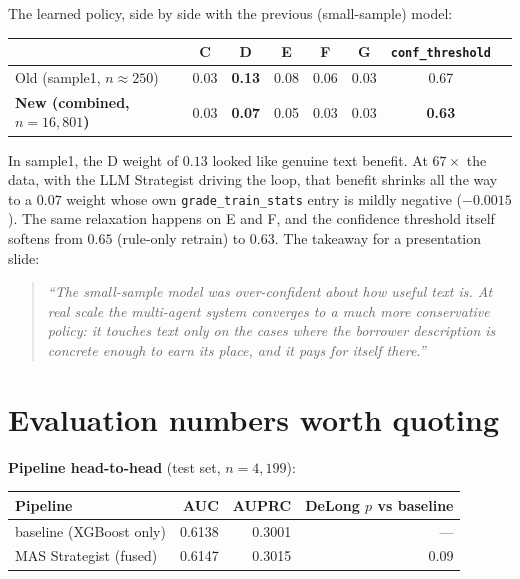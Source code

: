 \documentclass[11pt,letterpaper]{article}
\begin{document}
The learned policy, side by side with the previous (small-sample) model:

\begin{center}\small
\begin{tabular}{@{}lccccccc@{}}
\toprule
& \textbf{C} & \textbf{D} & \textbf{E} & \textbf{F} & \textbf{G} & \texttt{conf\_threshold} \\
\midrule
Old (sample1, $n \approx 250$)            & 0.03 & \textbf{0.13} & 0.08 & 0.06 & 0.03 & 0.67 \\
\textbf{New (combined, $n = 16{,}801$)}   & 0.03 & \textbf{0.07} & 0.05 & 0.03 & 0.03 & \textbf{0.63} \\
\bottomrule
\end{tabular}
\end{center}

In sample1, the D weight of $0.13$ looked like genuine text benefit. At
$67\times$ the data, with the LLM Strategist driving the loop, that
benefit shrinks all the way to a $0.07$ weight whose own
\texttt{grade\_train\_stats} entry is mildly negative ($-0.0015$). The same
relaxation happens on E and F, and the confidence threshold itself softens
from $0.65$ (rule-only retrain) to $0.63$. The takeaway for a presentation
slide:

\begin{quote}\small\itshape
``The small-sample model was over-confident about how useful text is. At
real scale the multi-agent system converges to a much more conservative
policy: it touches text only on the cases where the borrower description
is concrete enough to earn its place, and it pays for itself there.''
\end{quote}

\section{Evaluation numbers worth quoting}

\textbf{Pipeline head-to-head} (test set, $n = 4{,}199$):

\begin{center}\small
\begin{tabular}{@{}lrrr@{}}
\toprule
\textbf{Pipeline} & \textbf{AUC} & \textbf{AUPRC} & \textbf{DeLong $p$ vs baseline} \\
\midrule
baseline (XGBoost only)     & 0.6138 & 0.3001 & --- \\
MAS Strategist (fused)      & 0.6147 & 0.3015 & 0.09 \\
\bottomrule
\end{tabular}
\end{center}
\end{document}
